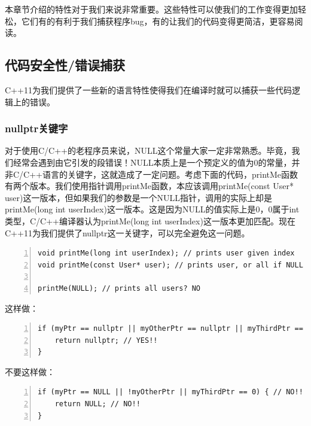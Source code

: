 \documentclass{ctexart}
\begin{document}
本章节介绍的特性对于我们来说非常重要。这些特性可以使我们的工作变得更加轻松，它们有的有利于我们捕获程序bug，有的让我们的代码变得更简洁，更容易阅读。

\subsection{代码安全性/错误捕获}

C++11为我们提供了一些新的语言特性使得我们在编译时就可以捕获一些代码逻辑上的错误。

\subsubsection{nullptr关键字}

对于使用C/C++的老程序员来说，NULL这个常量大家一定非常熟悉。毕竟，我们经常会遇到由它引发的段错误！NULL本质上是一个预定义的值为0的常量，并非C/C++语言的关键字，这就造成了一定问题。考虑下面的代码，printMe函数有两个版本。我们使用指针调用printMe函数，本应该调用printMe(const User* user)这一版本，但如果我们的参数是一个NULL指针，调用的实际上却是printMe(long int userIndex)这一版本。这是因为NULL的值实际上是0，0属于int类型，C/C++编译器认为printMe(long int userIndex)这一版本更加匹配。现在C++11为我们提供了nullptr这一关键字，可以完全避免这一问题。

\begin{lstlisting}[language={[ANSI]C},keywordstyle=\color{blue!70},commentstyle=\color{red!50!green!50!blue!50},frame=shadowbox, rulesepcolor=\color{red!20!green!20!blue!20},basicstyle=\small,numbers=left, numberstyle=\tiny,breaklines=true]
void printMe(long int userIndex); // prints user given index  
void printMe(const User* user); // prints user, or all if NULL  

printMe(NULL); // prints all users? NO
\end{lstlisting}

这样做：

\begin{lstlisting}[language={[ANSI]C},keywordstyle=\color{blue!70},commentstyle=\color{red!50!green!50!blue!50},frame=shadowbox, rulesepcolor=\color{red!20!green!20!blue!20},basicstyle=\small,numbers=left, numberstyle=\tiny,breaklines=true]
if (myPtr == nullptr || myOtherPtr == nullptr || myThirdPtr == nullptr) { // YES!!
	return nullptr; // YES!!  
}
\end{lstlisting}

不要这样做：

\begin{lstlisting}[language={[ANSI]C},keywordstyle=\color{blue!70},commentstyle=\color{red!50!green!50!blue!50},frame=shadowbox, rulesepcolor=\color{red!20!green!20!blue!20},basicstyle=\small,numbers=left, numberstyle=\tiny,breaklines=true]
if (myPtr == NULL || !myOtherPtr || myThirdPtr == 0) { // NO!!  
	return NULL; // NO!!
}
\end{lstlisting}
\end{document}
